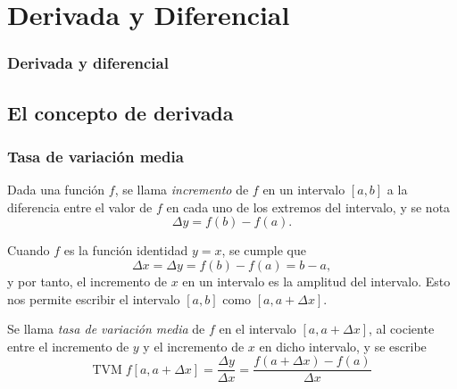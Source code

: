 

\section{Derivada y Diferencial} 
\begin{frame}
\frametitle{Derivada y diferencial}
\tableofcontents[sectionstyle=show/hide,hideothersubsections]
\end{frame}

\subsection{El concepto de derivada}

\begin{frame}
\frametitle{Tasa de variación media}
\begin{definicion}[Incremento]
Dada una función $f$, se llama \emph{incremento} de $f$ en un intervalo $[a,b]$ a la diferencia entre el valor de $f$ en cada uno de los extremos del intervalo, y se nota
\[\Delta y= f(b)-f(a).\]
\end{definicion}

Cuando $f$ es la función identidad $y=x$, se cumple que
\[\Delta x=\Delta y= f(b)-f(a)=b-a,\]
y por tanto, el incremento de $x$ en un intervalo es la amplitud del intervalo. Esto nos permite escribir el intervalo $[a,b]$ como $[a,a+\Delta x]$.

\begin{definicion}
Se llama \emph{tasa de variación media} de $f$ en el intervalo $[a,a+\Delta x]$, al cociente entre el incremento de $y$ y el incremento de $x$ en dicho intervalo, y se escribe
\[
\textrm{TVM}\;f[a,a+\Delta x]=\frac{\Delta y}{\Delta x}=\frac{f(a+\Delta x)-f(a)}{\Delta x} 
\]
\end{definicion}
\end{frame}


